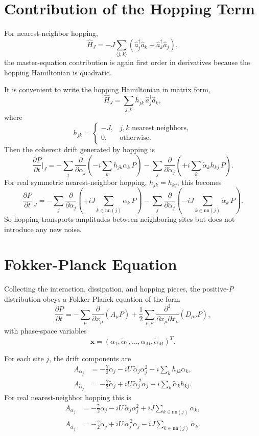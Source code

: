 \documentclass[12pt]{article}
\begin{document}
\section*{Contribution of the Hopping Term}
For nearest-neighbor hopping,
\[
\hat H_J
=
-J\sum_{\langle j,k\rangle}
\left(
\hat a_j^\dagger \hat a_k + \hat a_k^\dagger \hat a_j
\right),
\]
the master-equation contribution is again first order in derivatives because the hopping Hamiltonian is quadratic.

It is convenient to write the hopping Hamiltonian in matrix form,
\[
\hat H_J = \sum_{j,k} h_{jk}\,\hat a_j^\dagger \hat a_k,
\]
where
\[
h_{jk}=
\begin{cases}
-J, & j,k \text{ nearest neighbors},\\
0, & \text{otherwise}.
\end{cases}
\]
Then the coherent drift generated by hopping is
\[
\frac{\partial P}{\partial t}\Big|_{J}
=
-\sum_j \frac{\partial}{\partial \alpha_j}
\left(
-i\sum_k h_{jk}\alpha_k\,P
\right)
-\sum_j \frac{\partial}{\partial \widetilde{\alpha}_j}
\left(
+i\sum_k \widetilde{\alpha}_k h_{kj}\,P
\right).
\]
For real symmetric nearest-neighbor hopping, $h_{jk}=h_{kj}$, this becomes
\[
\frac{\partial P}{\partial t}\Big|_{J}
=
-\sum_j \frac{\partial}{\partial \alpha_j}
\left(
+iJ\sum_{k\in \mathrm{nn}(j)} \alpha_k\,P
\right)
-\sum_j \frac{\partial}{\partial \widetilde{\alpha}_j}
\left(
-iJ\sum_{k\in \mathrm{nn}(j)} \widetilde{\alpha}_k\,P
\right).
\]
So hopping transports amplitudes between neighboring sites but does not introduce any new noise.

\section*{Fokker-Planck Equation}
Collecting the interaction, dissipation, and hopping pieces, the positive-$P$ distribution obeys a Fokker-Planck equation of the form
\[
\frac{\partial P}{\partial t}
=
-\sum_\mu \frac{\partial}{\partial x_\mu}\left(A_\mu P\right)
+ \frac12 \sum_{\mu,\nu}
\frac{\partial^2}{\partial x_\mu \partial x_\nu}
\left(D_{\mu\nu}P\right),
\]
with phase-space variables
\[
\bm{x}
=
(\alpha_1,\widetilde{\alpha}_1,\dots,\alpha_M,\widetilde{\alpha}_M)^T.
\]

For each site $j$, the drift components are
\begin{align}
A_{\alpha_j}
&=
-\frac{\gamma}{2}\alpha_j
-iU\,\widetilde{\alpha}_j\alpha_j^2
-i\sum_k h_{jk}\alpha_k, \\
A_{\widetilde{\alpha}_j}
&=
-\frac{\gamma}{2}\widetilde{\alpha}_j
+iU\,\widetilde{\alpha}_j^{\,2}\alpha_j
+i\sum_k \widetilde{\alpha}_k h_{kj}.
\end{align}
For real nearest-neighbor hopping this is
\begin{align}
A_{\alpha_j}
&=
-\frac{\gamma}{2}\alpha_j
-iU\,\widetilde{\alpha}_j\alpha_j^2
+iJ\sum_{k\in \mathrm{nn}(j)} \alpha_k, \\
A_{\widetilde{\alpha}_j}
&=
-\frac{\gamma}{2}\widetilde{\alpha}_j
+iU\,\widetilde{\alpha}_j^{\,2}\alpha_j
-iJ\sum_{k\in \mathrm{nn}(j)} \widetilde{\alpha}_k.
\end{align}
\end{document}
